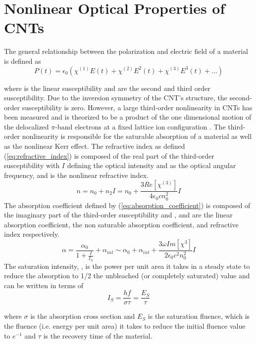 \section{Nonlinear Optical Properties of CNTs}
The general relationship between the polarization and electric field of a material is defined \cite{yamashita.tutorial} as
\begin{equation}
	P(t) = \epsilon_0(\chi^{(1)}E(t) + \chi^{(2)}E^2(t) + \chi^{(3)}E^3(t)+...)
\end{equation}

where is the linear susceptibility and are the second and third order susceptibility. Due to the inversion symmetry of the CNT’s structure, the second-order susceptibility is zero. However, a large third-order nonlinearity in CNTs has been measured \cite{martinez} and is theorized to be a product of the one dimensional motion of the delocalized $\pi$-band electrons at a fixed lattice ion configuration \cite{margulis}.  The third-order nonlinearity is responsible for the saturable absorption of a material as well as the nonlinear Kerr effect.
The refractive index as defined (\ref{eq:refractive_index}) is composed of the real part of the third-order susceptibility with $I$ defining the optical intensity and  as the optical angular frequency, and  is the nonlinear refractive index.
\begin{equation}
	n = n_0 + n_2I = n_0 + \frac{3Re[\chi^{(3)}]}{4\epsilon_0cn_0^2}I
	\label{eq:refractive_index}
\end{equation}
The absorption coefficient defined by (\ref{eq:absorption_coefficient}) is composed of the imaginary part of the third-order susceptibility and  ,  and  are the linear absorption coefficient, the non saturable absorption coefficient, and refractive index respectively.
\begin{equation}
	\alpha = \frac{\alpha_0}{1+\frac{I}{I_S}} + \alpha_{int} \sim\alpha_0 + \alpha_{int} + \frac{3\omega Im[\chi^{3}]}{2\epsilon_0c^2n_0^2}I
	\label{eq:absorption_coefficient}
\end{equation}
The saturation intensity, , is the power per unit area it takes in a steady state to reduce the absorption to 1/2 the unbleached (or completely saturated) value and can be written in terms of
\begin{equation}
	I_S = \frac{hf}{\sigma\tau} =\frac{E_S}{\tau}
	\label{eq:saturation_intensity}
\end{equation}

where  $\sigma$ is the absorption cross section and $E_S$ is the saturation fluence, which is the fluence (i.e. energy per unit area) it takes to reduce the initial fluence value to $e^{-1}$ and  $\tau$ is the recovery time of the material.

